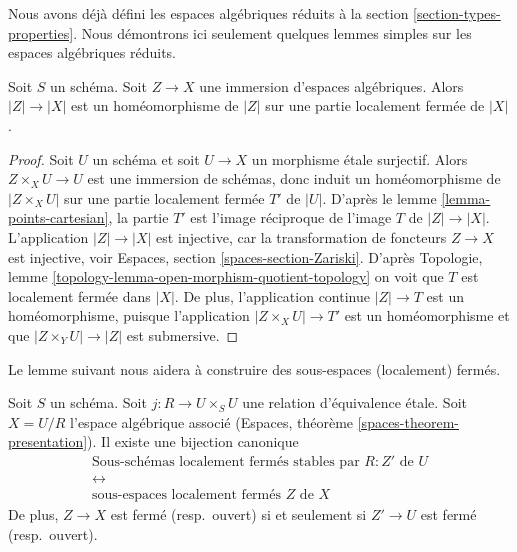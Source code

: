 \noindent
Nous avons déjà défini les espaces algébriques réduits à la
section \ref{section-types-properties}.
Nous démontrons ici seulement quelques lemmes simples sur les espaces
algébriques réduits.

\begin{lemma}
\label{lemma-subspace-induced-topology}
Soit $S$ un schéma. Soit $Z \to X$ une immersion d'espaces algébriques.
Alors $|Z| \to |X|$ est un homéomorphisme de $|Z|$ sur une partie localement fermée
de $|X|$.
\end{lemma}

\begin{proof}
Soit $U$ un schéma et soit $U \to X$ un morphisme \'etale surjectif.
Alors $Z \times_X U \to U$ est une immersion de schémas, donc induit un
homéomorphisme de $|Z \times_X U|$ sur une partie localement fermée $T'$
de $|U|$. D'après le lemme \ref{lemma-points-cartesian}, la partie
$T'$ est l'image réciproque de l'image $T$ de $|Z| \to |X|$.
L'application $|Z| \to |X|$ est injective, car la transformation de
foncteurs $Z \to X$ est injective, voir
Espaces, section \ref{spaces-section-Zariski}. D'après
Topologie, lemme \ref{topology-lemma-open-morphism-quotient-topology}
on voit que $T$ est localement fermée dans $|X|$. De plus, l'application continue
$|Z| \to T$ est un homéomorphisme, puisque l'application $|Z \times_X U| \to T'$
est un homéomorphisme et que $|Z \times_Y U| \to |Z|$ est submersive.
\end{proof}

\noindent
Le lemme suivant nous aidera à construire des sous-espaces
(localement) fermés.

\begin{lemma}
\label{lemma-subspaces-presentation}
Soit $S$ un schéma. Soit $j : R \to U \times_S U$ une relation d'équivalence \'etale.
Soit $X = U/R$ l'espace algébrique associé
(Espaces, théorème \ref{spaces-theorem-presentation}). Il existe une
bijection canonique
$$
\begin{gathered}
\text{Sous-schémas localement fermés stables par }R : Z'\text{ de }U\\[2pt]
\leftrightarrow\\[2pt]
\text{sous-espaces localement fermés }Z\text{ de }X
\end{gathered}
$$
De plus, $Z \to X$ est fermé (resp.\ ouvert) si et seulement si
$Z' \to U$ est fermé (resp.\ ouvert).
\end{lemma}

